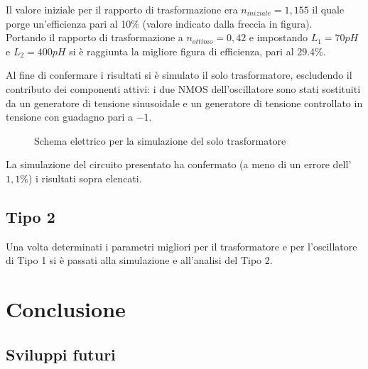 \documentclass[a4paper, 12pt]{memoir}
\begin{document}
Il valore iniziale per il rapporto di trasformazione era $n_{iniziale}=1,155$
il quale porge un'efficienza pari al 10\% (valore indicato dalla freccia in
figura).\\
Portando il rapporto di trasformazione a $n_{ottimo}=0,42$ e impostando
$L_1=70pH$ e $L_2=400pH$ si è raggiunta la migliore figura di efficienza, pari
al 29.4\%.

Al fine di confermare i risultati si è simulato il solo trasformatore,
escludendo il contributo dei componenti attivi: i due NMOS dell'oscillatore
sono stati sostituiti da un generatore di tensione sinusoidale e un generatore
di tensione controllato in tensione con guadagno pari a $-1$.
\begin{figure}[h]
\centering

\caption{Schema elettrico per la simulazione del solo trasformatore}
\end{figure}

\noindent La simulazione del circuito presentato ha confermato (a meno di un
errore dell'$1,1\%$) i risultati sopra elencati.

\section{Tipo 2}
Una volta determinati i parametri migliori per il trasformatore e per 
l'oscillatore di Tipo 1 si è passati alla simulazione e all'analisi del Tipo 2.

\cleardoublepage{}
\chapter{Conclusione}

\section{Sviluppi futuri}



\end{document}
